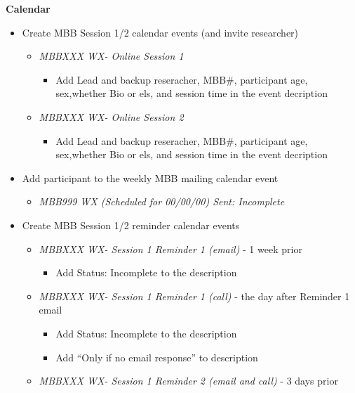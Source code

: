 \documentclass[
]{book}
\providecommand{\tightlist}{%
  \setlength{\itemsep}{0pt}\setlength{\parskip}{0pt}}
\begin{document}
\textbf{Calendar}

\begin{itemize}
\tightlist
\item
  Create MBB Session 1/2 calendar events (and invite researcher)

  \begin{itemize}
  \tightlist
  \item
    \emph{MBBXXX WX- Online Session 1}

    \begin{itemize}
    \tightlist
    \item
      Add Lead and backup reseracher, MBB\#, participant age, sex,whether Bio or els, and session time in the event decription
    \end{itemize}
  \item
    \emph{MBBXXX WX- Online Session 2}

    \begin{itemize}
    \tightlist
    \item
      Add Lead and backup reseracher, MBB\#, participant age, sex,whether Bio or els, and session time in the event decription
    \end{itemize}
  \end{itemize}
\item
  Add participant to the weekly MBB mailing calendar event

  \begin{itemize}
  \tightlist
  \item
    \emph{MBB999 WX (Scheduled for 00/00/00) Sent: Incomplete}
  \end{itemize}
\item
  Create MBB Session 1/2 reminder calendar events

  \begin{itemize}
  \tightlist
  \item
    \emph{MBBXXX WX- Session 1 Reminder 1 (email)} - 1 week prior

    \begin{itemize}
    \tightlist
    \item
      Add Status: Incomplete to the description
    \end{itemize}
  \item
    \emph{MBBXXX WX- Session 1 Reminder 1 (call)} - the day after Reminder 1 email

    \begin{itemize}
    \tightlist
    \item
      Add Status: Incomplete to the description
    \item
      Add ``Only if no email response'' to description
    \end{itemize}
  \item
    \emph{MBBXXX WX- Session 1 Reminder 2 (email and call)} - 3 days prior


\end{itemize}
\end{itemize}
\end{document}
